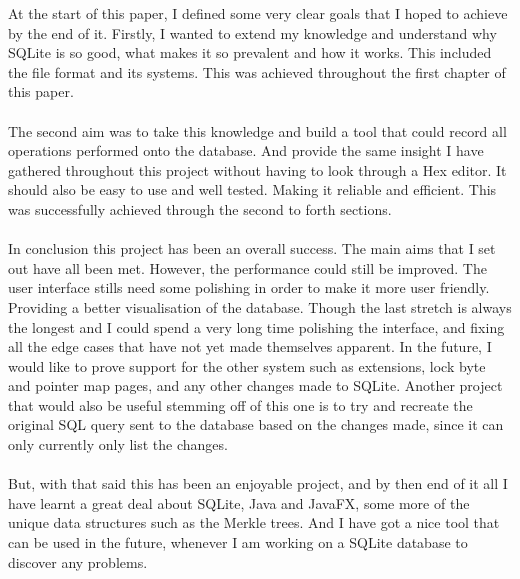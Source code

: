 At the start of this paper, I defined some very clear goals that I hoped to achieve by the end of it. Firstly, I wanted to extend my knowledge and understand why SQLite is so good, what makes it so prevalent and how it works. This included the file format and its systems. This was achieved throughout the first chapter of this paper. 
\\\\
The second aim was to take this knowledge and build a tool that could record all operations performed onto the database. And provide the same insight I have gathered throughout this project without having to look through a Hex editor. It should also be easy to use and well tested. Making it reliable and efficient. This was successfully achieved through the second to forth sections.
\\\\
In conclusion this project has been an overall success. The main aims that I set out have all been met. However, the performance could still be improved. The user interface stills need some polishing in order to make it more user friendly. Providing a better visualisation of the database. Though the last stretch is always the longest and I could spend a very long time polishing the  interface, and fixing all the edge cases that have not yet made themselves apparent. In the future, I would like to prove support for the other system such as  extensions, lock byte and pointer map pages, and any other changes made to SQLite. Another project that would also be useful stemming off of this one is to try and recreate the original SQL query sent to the database based on the changes made, since it can only currently only list the changes. 
\\\\
But, with that said this has been an enjoyable project, and by then end of it all I have learnt a great deal about SQLite, Java and JavaFX, some more of the unique data structures such as the Merkle trees. And I have got a nice tool that can be used in the future, whenever I am working on a SQLite database to discover any problems.